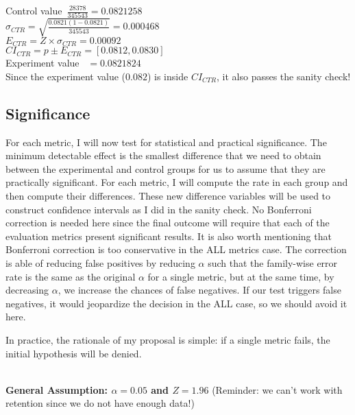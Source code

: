 \documentclass[11pt]{article}
\begin{document}
		Control value~$\frac{28378}{345543} = 0.0821258$\\
		$\sigma_{CTR} = \sqrt{\frac{0.0821(1-0.0821)}{345543}} = 0.000468$\\
		$E_{CTR} = Z \times \sigma_{CTR} = 0.00092$\\
		$CI_{CTR} = p \pm E_{CTR} = [0.0812, 0.0830]$\\
		Experiment value ~$=0.0821824$\\
		
		Since the experiment value ($0.082$) is inside $CI_{CTR}$, it also passes the sanity check!
	
	\subsection{Significance}
	
		For each metric, I will now test for statistical and practical significance.
		The minimum detectable effect is the smallest difference that we need to obtain between the experimental and control groups for us to assume that they are practically significant.
		For each metric, I will compute the rate in each group and then compute their differences.
		These new difference variables will be used to construct confidence intervals as I did in the sanity check.
		No Bonferroni correction is needed here since the final outcome will require that each of the evaluation metrics present significant results.
		It is also worth mentioning that Bonferroni correction is too conservative in the ALL metrics case.
		The correction is able of reducing false positives by reducing $\alpha$ such that the family-wise error rate is the same as the original $\alpha$ for a single metric, but at the same time, by decreasing $\alpha$, we increase the chances of false negatives.
		If our test triggers false negatives, it would jeopardize the decision in the ALL case, so we should avoid it here.
		
		In practice, the rationale of my proposal is simple: if a single metric fails, the initial hypothesis will be denied.

		~\\
		\textbf{General Assumption: $\alpha=0.05$ and $Z=1.96$}
		(Reminder: we can't work with retention since we do not have enough data!)
		
\end{document}
